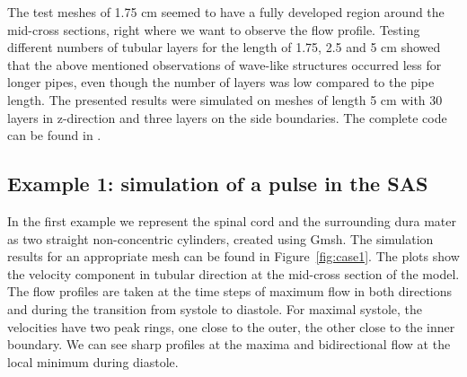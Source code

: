 The test meshes of 1.75 cm seemed to have a fully developed region
around the mid-cross sections, right where we want to observe the flow
profile. Testing different numbers of tubular layers for the length of
1.75, 2.5 and 5 cm showed that the above mentioned observations of
wave-like structures occurred less for longer pipes, even though the
number of layers was low compared to the pipe length.  The presented
results were simulated on meshes of length 5 cm with 30 layers in
z-direction and three layers on the side boundaries. The complete code
can be found in .

\subsection{Example 1: simulation of a pulse in the SAS}

In the first example we represent the spinal cord and the surrounding dura mater as two straight non-concentric cylinders, created using Gmsh.
The simulation results for an appropriate mesh can be found in
Figure~\ref{fig:case1}. The plots show the velocity component in tubular direction
at the mid-cross section of the model. The flow profiles are taken at
the time steps of maximum flow in both directions and during the
transition from systole to diastole. For maximal systole, the
velocities have two peak rings, one close to the outer, the other
close to the inner boundary. We can see sharp profiles at the maxima
and bidirectional flow at the local minimum during diastole.

